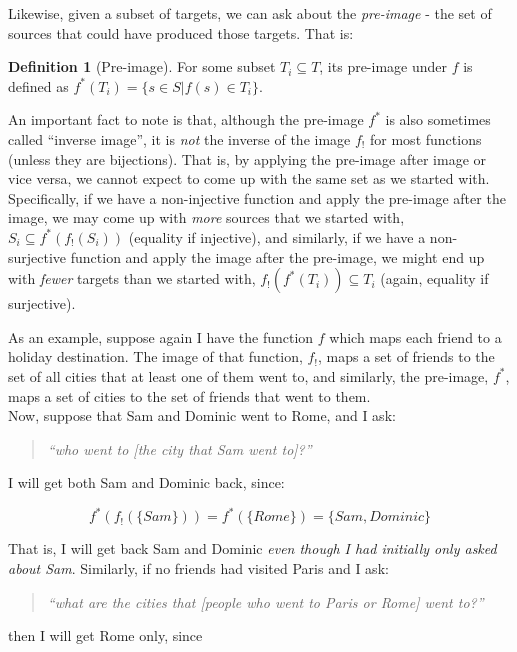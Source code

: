 \documentclass[
]{book}
\theoremstyle{definition}
\newtheorem{definition}{Definition}[chapter]
\theoremstyle{definition}
\theoremstyle{definition}
\theoremstyle{definition}
\theoremstyle{remark}
\begin{document}
Likewise, given a subset of targets, we can ask about the \emph{pre-image} - the set of sources that could have produced those targets. That is:

\begin{definition}[Pre-image]
For some subset \(T_i \subseteq T\), its pre-image under \(f\) is defined as \(f^*(T_i) = \{ s \in S \lvert f(s) \in T_i \}\).
\end{definition}

An important fact to note is that, although the pre-image \(f^*\) is also sometimes called ``inverse image'', it is \emph{not} the inverse of the image \(f_!\) for most functions (unless they are bijections). That is, by applying the pre-image after image or vice versa, we cannot expect to come up with the same set as we started with. Specifically, if we have a non-injective function and apply the pre-image after the image, we may come up with \emph{more} sources that we started with, \(S_i \subseteq f^*(f_!(S_i))\) (equality if injective), and similarly, if we have a non-surjective function and apply the image after the pre-image, we might end up with \emph{fewer} targets than we started with, \(f_!(f^*(T_i)) \subseteq T_i\) (again, equality if surjective).

As an example, suppose again I have the function \(f\) which maps each friend to a holiday destination. The image of that function, \(f_!\), maps a set of friends to the set of all cities that at least one of them went to, and similarly, the pre-image, \(f^*\), maps a set of cities to the set of friends that went to them.\\
Now, suppose that Sam and Dominic went to Rome, and I ask:

\begin{quote}
\emph{``who went to {[}the city that Sam went to{]}?''}
\end{quote}

I will get both Sam and Dominic back, since:

\[f^*(f_!(\{ Sam \})) = f^*(\{ Rome \}) = \{ Sam, Dominic \}\]

That is, I will get back Sam and Dominic \emph{even though I had initially only asked about Sam}. Similarly, if no friends had visited Paris and I ask:

\begin{quote}
\emph{``what are the cities that {[}people who went to Paris or Rome{]} went to?''}
\end{quote}

then I will get Rome only, since
\end{document}
